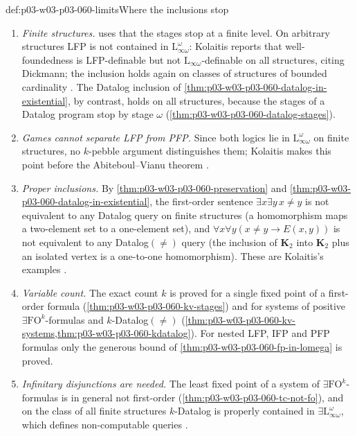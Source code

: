 \begin{hbwarning}{def:p03-w03-p03-060-limits}{Where the inclusions stop}
\begin{enumerate}
\item \emph{Finite structures.} 
      uses that the stages stop at a finite level. On arbitrary structures
      LFP is not contained in \(\mathrm{L}^\omega_{\infty\omega}\): Kolaitis
      reports that well-foundedness is LFP-definable but not
      \(\mathrm{L}_{\infty\omega}\)-definable on all structures, citing
      Dickmann; the inclusion holds again on classes of structures of
      bounded cardinality \cite[p.~54]{Kolaitis2003ExpressivePowerNotes}.
      The Datalog inclusion of \cref{thm:p03-w03-p03-060-datalog-in-existential},
      by contrast, holds on all structures, because the stages of a Datalog
      program stop by stage \(\omega\)
      (\cref{thm:p03-w03-p03-060-datalog-stages}).
\item \emph{Games cannot separate LFP from PFP.} Since both logics lie in
      \(\mathrm{L}^\omega_{\infty\omega}\) on finite structures, no
      \(k\)-pebble argument distinguishes them; Kolaitis makes this point
      before the Abiteboul--Vianu theorem
      \cite[p.~67]{Kolaitis2003ExpressivePowerNotes}.
\item \emph{Proper inclusions.} By
      \cref{thm:p03-w03-p03-060-preservation} and
      \cref{thm:p03-w03-p03-060-datalog-in-existential}, the first-order
      sentence \(\exists x\exists y\,x\neq y\) is not equivalent to any
      Datalog query on finite structures (a homomorphism maps a two-element
      set to a one-element set), and
      \(\forall x\forall y(x\neq y\to E(x,y))\) is not equivalent to any
      Datalog\((\neq)\) query (the inclusion of \(\mathbf K_2\) into
      \(\mathbf K_2\) plus an isolated vertex is a one-to-one
      homomorphism). These are Kolaitis's examples
      \cite[pp.~44 and~46]{Kolaitis2003ExpressivePowerNotes}.
\item \emph{Variable count.} The exact count \(k\) is proved for a single
      fixed point of a first-order formula
      (\cref{thm:p03-w03-p03-060-kv-stages}) and for systems of positive
      \(\exists\mathrm{FO}^k\)-formulas and \(k\)-Datalog\((\neq)\)
      (\cref{thm:p03-w03-p03-060-kv-systems,thm:p03-w03-p03-060-kdatalog}).
      For nested LFP, IFP and PFP formulas only the generous bound of
      \cref{thm:p03-w03-p03-060-fp-in-lomega} is proved.
\item \emph{Infinitary disjunctions are needed.} The least fixed point of a
      system of \(\exists\mathrm{FO}^k\)-formulas is in general not
      first-order (\cref{thm:p03-w03-p03-060-tc-not-fo}), and on the class
      of all finite structures \(k\)-Datalog is properly contained in
      \(\exists\mathrm{L}^\omega_{\infty\omega}\), which defines
      non-computable queries \cite[p.~71]{Kolaitis2003ExpressivePowerNotes}.
\end{enumerate}
\end{hbwarning}

